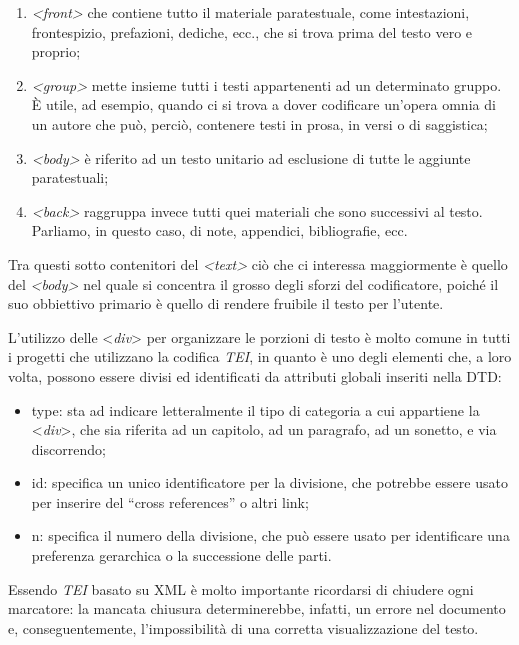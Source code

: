 \documentclass[
  b5paper,
  twoside,
  11pt,
  chapterprefix=false,
  bibliography=totocnumbered,
  parskip=0]{scrbook}
\begin{document}
\begin{enumerate}
\def\labelenumi{\arabic{enumi}.}
\item
  \emph{\textless front\textgreater{}} che contiene tutto il materiale paratestuale, come
  intestazioni, frontespizio, prefazioni, dediche, ecc., che si trova
  prima del testo vero e proprio;
\item
  \emph{\textless group\textgreater{}} mette insieme tutti i testi appartenenti ad un
  determinato gruppo. È utile, ad esempio, quando ci si trova a dover
  codificare un'opera omnia di un autore che può, perciò, contenere
  testi in prosa, in versi o di saggistica;
\item
  \emph{\textless body\textgreater{}} è riferito ad un testo unitario ad esclusione di tutte le
  aggiunte paratestuali;
\item
  \emph{\textless back\textgreater{}} raggruppa invece tutti quei materiali che sono successivi
  al testo. Parliamo, in questo caso, di note, appendici,
  bibliografie, ecc.
\end{enumerate}

Tra questi sotto contenitori del \emph{\textless text\textgreater{}} ciò che ci interessa
maggiormente è quello del \emph{\textless body\textgreater{}} nel quale si concentra il grosso
degli sforzi del codificatore, poiché il suo obbiettivo primario è
quello di rendere fruibile il testo per l'utente.

L'utilizzo delle \textless{}\emph{div}\textgreater{} per organizzare le porzioni di testo è molto
comune in tutti i progetti che utilizzano la codifica \emph{TEI}, in quanto è
uno degli elementi che, a loro volta, possono essere divisi ed
identificati da attributi globali inseriti nella DTD:

\begin{itemize}
\item
  type: sta ad indicare letteralmente il tipo di categoria a cui
  appartiene la \textless{}\emph{div}\textgreater, che sia riferita ad un capitolo, ad un
  paragrafo, ad un sonetto, e via discorrendo;
\item
  id: specifica un unico identificatore per la divisione, che potrebbe
  essere usato per inserire del \enquote{cross references} o altri link;
\item
  n: specifica il numero della divisione, che può essere usato per
  identificare una preferenza gerarchica o la successione delle parti.
\end{itemize}

Essendo \emph{TEI} basato su XML è molto importante ricordarsi di chiudere
ogni marcatore: la mancata chiusura determinerebbe, infatti, un errore
nel documento e, conseguentemente, l'impossibilità di una corretta
visualizzazione del testo.
\end{document}
